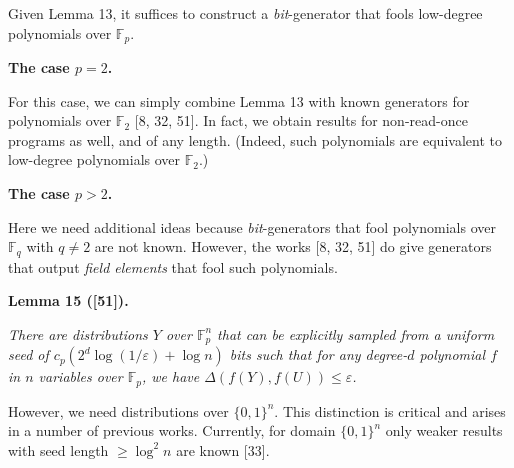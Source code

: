 Given Lemma 13, it suffices to construct a \emph{bit}-generator that fools low-degree polynomials over $\mathbb{F}_{p}$.\par





\par\medskip\noindent\textbf{The case $p=2$.}\par




For this case, we can simply combine Lemma 13
with known generators for polynomials over $\mathbb{F}_{2}$ [8, 32, 51]. In fact, we obtain results for non-read-once programs
as well, and of any length. (Indeed, such polynomials are equivalent
to low-degree polynomials over $\mathbb{F}_{2}$.)\par





\par\medskip\noindent\textbf{The case $p>2$.}\par




Here we need additional ideas because \emph{bit}-generators that fool polynomials over
$\mathbb{F}_{q}$ with $q\neq 2$ are not known. However, the works
[8, 32, 51] do give generators that output \emph{field elements} that fool such polynomials.\par





\par\medskip\noindent\textbf{
\textbf{Lemma 15}\textbf{ }([51])\textbf{.}
}\par



\emph{There are distributions $Y$ over $\mathbb{F}_{p}^{n}$
that can be explicitly sampled from a uniform seed of $c_{p}(2^{d}\log(1/\varepsilon)+\log n)$
bits such that for any degree-$d$ polynomial $f$ in $n$ variables over
$\mathbb{F}_{p}$, we have $\Delta(f(Y),f(U))\leq\varepsilon$.}\par






However, we need distributions over $\{0,1\}^{n}$. This distinction is critical
and arises in a number of previous works. Currently, for domain $\{0,1\}^{n}$
only weaker results with seed length $\geq\log^{2}n$ are known [33].\par




